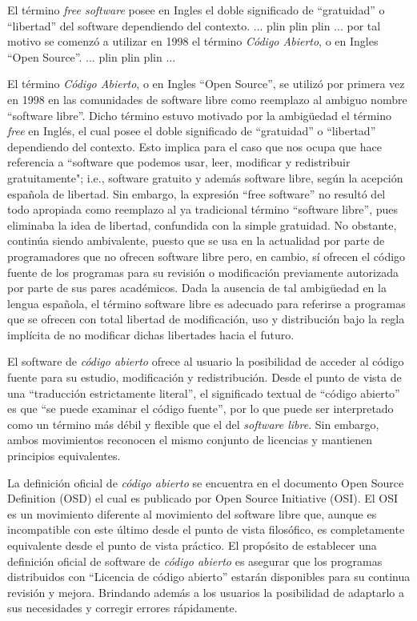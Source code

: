 El término \textit{free software} posee en Ingles el doble significado
de ``gratuidad'' o ``libertad'' del software dependiendo del
contexto. ... plin plin plin ... por tal motivo se comenzó a utilizar
en 1998 el término \textit{Código Abierto}, o en Ingles ``Open
Source''. ... plin plin plin ...


El término \textit{Código Abierto}, o en Ingles ``Open Source'', se
utilizó por primera vez en 1998 en las comunidades de software libre
como reemplazo al ambiguo nombre ``software libre''. Dicho término
estuvo motivado por la ambigüedad el término \textit{free} en Inglés,
el cual posee el doble significado de ``gratuidad'' o ``libertad''
dependiendo del contexto. Esto implica para el caso que nos ocupa que
hace referencia a ``software que podemos usar, leer, modificar y
redistribuir gratuitamente"; i.e., software gratuito y además software
libre, según la acepción española de libertad. Sin embargo, la
expresión ``free software'' no resultó del todo apropiada como
reemplazo al ya tradicional término ``software libre'', pues eliminaba
la idea de libertad, confundida con la simple gratuidad. No obstante,
continúa siendo ambivalente, puesto que se usa en la actualidad por
parte de programadores que no ofrecen software libre pero, en cambio,
sí ofrecen el código fuente de los programas para su revisión o
modificación previamente autorizada por parte de sus pares
académicos. Dada la ausencia de tal ambigüedad en la lengua española,
el término software libre es adecuado para referirse a programas que
se ofrecen con total libertad de modificación, uso y distribución bajo
la regla implícita de no modificar dichas libertades hacia el futuro.

El software de \textit{código abierto} ofrece al usuario la
posibilidad de acceder al código fuente para su estudio, modificación
y redistribución. Desde el punto de vista de una ``traducción
estrictamente literal'', el significado textual de ``código abierto''
es que ``se puede examinar el código fuente'', por lo que puede ser
interpretado como un término más débil y flexible que el del
\textit{software libre}. Sin embargo, ambos movimientos reconocen el
mismo conjunto de licencias y mantienen principios equivalentes.

La definición oficial de \textit{código abierto} se encuentra en el
documento Open Source Definition (OSD) el cual es publicado por Open
Source Initiative (OSI). El OSI es un movimiento diferente al
movimiento del software libre que, aunque es incompatible con este
último desde el punto de vista filosófico, es completamente
equivalente desde el punto de vista práctico. El propósito de
establecer una definición oficial de software de \textit{código
  abierto} es asegurar que los programas distribuidos con ``Licencia
de código abierto'' estarán disponibles para su continua revisión y
mejora. Brindando además a los usuarios la posibilidad de adaptarlo a
sus necesidades y corregir errores rápidamente.

